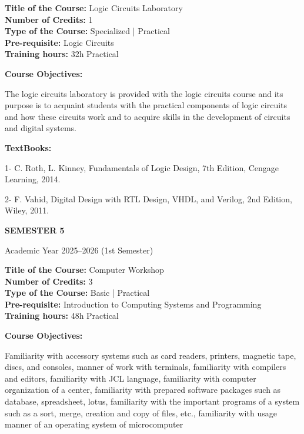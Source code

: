\documentclass[12pt,a4paper]{article}
\begin{document}
\newpage
\textbf{Title of the Course:} Logic Circuits Laboratory\\
\textbf{Number of Credits:} 1\\
\textbf{Type of the Course:} Specialized | Practical\\
\textbf{Pre-requisite:} Logic Circuits\\
\textbf{Training hours:} 32h Practical\par\vspace{4pt}
\textbf{Course Objectives:}\par\vspace{2pt}
The logic circuits laboratory is provided with the logic circuits course and its purpose is to acquaint
students with the practical components of logic circuits and how these circuits work and to acquire
skills in the development of circuits and digital systems.\par\vspace{4pt}
\textbf{TextBooks:}\par\vspace{2pt}
1- C. Roth, L. Kinney, Fundamentals of Logic Design, 7th Edition, Cengage Learning, 2014.\par
2- F. Vahid, Digital Design with RTL Design, VHDL, and Verilog, 2nd Edition, Wiley, 2011.\par
\vspace{4pt}

\newpage
\vspace*{\fill}
\begin{center}
  {\fontsize{28pt}{34pt}\selectfont \textbf{SEMESTER 5}}\par\vspace{12pt}
  {\fontsize{13pt}{17pt}\selectfont Academic Year 2025–2026 (1st Semester)}
\end{center}
\vspace*{\fill}

\newpage
\textbf{Title of the Course:} Computer Workshop\\
\textbf{Number of Credits:} 3\\
\textbf{Type of the Course:} Basic | Practical\\
\textbf{Pre-requisite:} Introduction to Computing Systems and Programming\\
\textbf{Training hours:} 48h Practical\par\vspace{4pt}
\textbf{Course Objectives:}\par\vspace{2pt}
Familiarity with accessory systems such as card readers, printers, magnetic tape, discs, and
consoles, manner of work with terminals, familiarity with compilers and editors, familiarity with
JCL language, familiarity with computer organization of a center, familiarity with prepared
software packages such as database, spreadsheet, lotus, familiarity with the important programs of
a system such as a sort, merge, creation and copy of files, etc., familiarity with usage manner of
an operating system of microcomputer\par\vspace{4pt}
\end{document}
